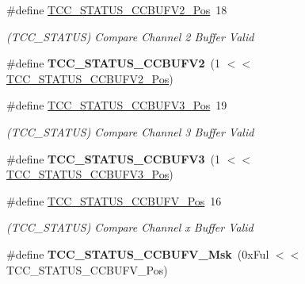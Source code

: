 \begin{DoxyCompactItemize}
\item 
\hypertarget{group___s_a_m_l21___t_c_c_gaad0bbb461db56cb1d158ac976ffb7c34}{}\#define \hyperlink{group___s_a_m_l21___t_c_c_gaad0bbb461db56cb1d158ac976ffb7c34}{T\+C\+C\+\_\+\+S\+T\+A\+T\+U\+S\+\_\+\+C\+C\+B\+U\+F\+V2\+\_\+\+Pos}~18\label{group___s_a_m_l21___t_c_c_gaad0bbb461db56cb1d158ac976ffb7c34}

\begin{DoxyCompactList}\small\item\em (T\+C\+C\+\_\+\+S\+T\+A\+T\+U\+S) Compare Channel 2 Buffer Valid \end{DoxyCompactList}\item 
\hypertarget{group___s_a_m_l21___t_c_c_gac3b25f688f4e1b8f5ec1f430b9755248}{}\#define {\bfseries T\+C\+C\+\_\+\+S\+T\+A\+T\+U\+S\+\_\+\+C\+C\+B\+U\+F\+V2}~(1 $<$$<$ \hyperlink{group___s_a_m_l21___t_c_c_gaad0bbb461db56cb1d158ac976ffb7c34}{T\+C\+C\+\_\+\+S\+T\+A\+T\+U\+S\+\_\+\+C\+C\+B\+U\+F\+V2\+\_\+\+Pos})\label{group___s_a_m_l21___t_c_c_gac3b25f688f4e1b8f5ec1f430b9755248}

\item 
\hypertarget{group___s_a_m_l21___t_c_c_ga4951699ca1964be585474a17660cb4c9}{}\#define \hyperlink{group___s_a_m_l21___t_c_c_ga4951699ca1964be585474a17660cb4c9}{T\+C\+C\+\_\+\+S\+T\+A\+T\+U\+S\+\_\+\+C\+C\+B\+U\+F\+V3\+\_\+\+Pos}~19\label{group___s_a_m_l21___t_c_c_ga4951699ca1964be585474a17660cb4c9}

\begin{DoxyCompactList}\small\item\em (T\+C\+C\+\_\+\+S\+T\+A\+T\+U\+S) Compare Channel 3 Buffer Valid \end{DoxyCompactList}\item 
\hypertarget{group___s_a_m_l21___t_c_c_ga57ae5fb886b4b8b1ac1c97411fdded0f}{}\#define {\bfseries T\+C\+C\+\_\+\+S\+T\+A\+T\+U\+S\+\_\+\+C\+C\+B\+U\+F\+V3}~(1 $<$$<$ \hyperlink{group___s_a_m_l21___t_c_c_ga4951699ca1964be585474a17660cb4c9}{T\+C\+C\+\_\+\+S\+T\+A\+T\+U\+S\+\_\+\+C\+C\+B\+U\+F\+V3\+\_\+\+Pos})\label{group___s_a_m_l21___t_c_c_ga57ae5fb886b4b8b1ac1c97411fdded0f}

\item 
\hypertarget{group___s_a_m_l21___t_c_c_gae45835d62a6b59413e04a2914c8ca9ce}{}\#define \hyperlink{group___s_a_m_l21___t_c_c_gae45835d62a6b59413e04a2914c8ca9ce}{T\+C\+C\+\_\+\+S\+T\+A\+T\+U\+S\+\_\+\+C\+C\+B\+U\+F\+V\+\_\+\+Pos}~16\label{group___s_a_m_l21___t_c_c_gae45835d62a6b59413e04a2914c8ca9ce}

\begin{DoxyCompactList}\small\item\em (T\+C\+C\+\_\+\+S\+T\+A\+T\+U\+S) Compare Channel x Buffer Valid \end{DoxyCompactList}\item 
\hypertarget{group___s_a_m_l21___t_c_c_ga92a9162a4f81ba4e0f9b164cf8cdbb36}{}\#define {\bfseries T\+C\+C\+\_\+\+S\+T\+A\+T\+U\+S\+\_\+\+C\+C\+B\+U\+F\+V\+\_\+\+Msk}~(0x\+Ful $<$$<$ T\+C\+C\+\_\+\+S\+T\+A\+T\+U\+S\+\_\+\+C\+C\+B\+U\+F\+V\+\_\+\+Pos)\label{group___s_a_m_l21___t_c_c_ga92a9162a4f81ba4e0f9b164cf8cdbb36}


\end{DoxyCompactItemize}
